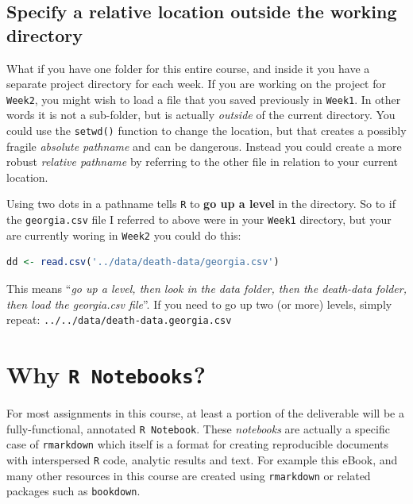 \documentclass[
]{book}
\newcommand{\passthrough}[1]{#1}
\begin{document}
\hypertarget{specify-a-relative-location-outside-the-working-directory}{%
\subsection*{Specify a relative location outside the working directory}\label{specify-a-relative-location-outside-the-working-directory}}

What if you have one folder for this entire course, and inside it you have a separate project directory for each week. If you are working on the project for \passthrough{\lstinline!Week2!}, you might wish to load a file that you saved previously in \passthrough{\lstinline!Week1!}. In other words it is not a sub-folder, but is actually \emph{outside} of the current directory. You could use the \passthrough{\lstinline!setwd()!} function to change the location, but that creates a possibly fragile \emph{absolute pathname} and can be dangerous. Instead you could create a more robust \emph{relative pathname} by referring to the other file in relation to your current location.

Using two dots in a pathname tells \passthrough{\lstinline!R!} to \textbf{go up a level} in the directory. So to if the \passthrough{\lstinline!georgia.csv!} file I referred to above were in your \passthrough{\lstinline!Week1!} directory, but your are currently woring in \passthrough{\lstinline!Week2!} you could do this:

\begin{lstlisting}[language=R]
dd <- read.csv('../data/death-data/georgia.csv')
\end{lstlisting}

This means ``\emph{go up a level, then look in the data folder, then the death-data folder, then load the georgia.csv file}''. If you need to go up two (or more) levels, simply repeat: \passthrough{\lstinline!../../data/death-data.georgia.csv!}

\hypertarget{why-r-notebooks}{%
\section*{\texorpdfstring{Why \texttt{R\ Notebooks}?}{Why R Notebooks?}}\label{why-r-notebooks}}

For most assignments in this course, at least a portion of the deliverable will be a fully-functional, annotated \passthrough{\lstinline!R Notebook!}. These \emph{notebooks} are actually a specific case of \passthrough{\lstinline!rmarkdown!} which itself is a format for creating reproducible documents with interspersed \passthrough{\lstinline!R!} code, analytic results and text. For example this eBook, and many other resources in this course are created using \passthrough{\lstinline!rmarkdown!} or related packages such as \passthrough{\lstinline!bookdown!}.
\end{document}

